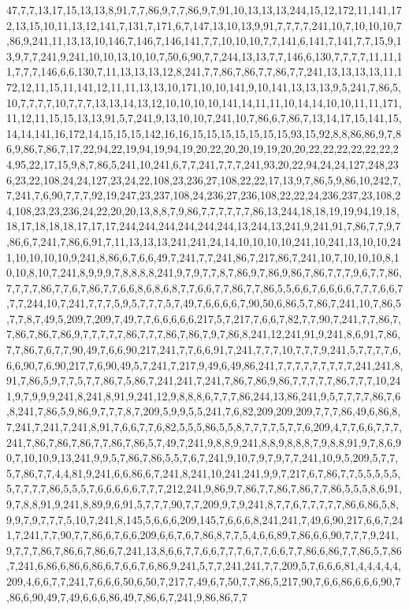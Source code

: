 47,7,7,13,17,15,13,13,8,91,7,7,86,9,7,7,86,9,7,91,10,13,13,13,244,15,12,172,11,141,172,13,15,10,11,13,12,141,7,131,7,171,6,7,147,13,10,13,9,91,7,7,7,7,241,10,7,10,10,10,7,86,9,241,11,13,13,10,146,7,146,7,146,141,7,7,10,10,10,7,7,141,6,141,7,141,7,7,15,9,13,9,7,7,241,9,241,10,10,13,10,10,7,50,6,90,7,7,244,13,13,7,7,146,6,130,7,7,7,7,11,11,11,7,7,7,146,6,6,130,7,11,13,13,13,12,8,241,7,7,86,7,86,7,7,86,7,7,241,13,13,13,13,11,172,12,11,15,11,141,12,11,11,13,13,10,171,10,10,141,9,10,141,13,13,13,9,5,241,7,86,5,10,7,7,7,7,10,7,7,7,13,13,14,13,12,10,10,10,10,141,14,11,11,10,14,14,10,10,11,11,171,11,12,11,15,15,13,13,91,5,7,241,9,13,10,10,7,241,10,7,86,6,7,86,7,13,14,17,15,141,15,14,14,141,16,172,14,15,15,15,142,16,16,15,15,15,15,15,15,15,93,15,92,8,8,86,86,9,7,86,9,86,7,86,7,17,22,94,22,19,94,19,94,19,20,22,20,20,19,19,20,20,22,22,22,22,22,22,24,95,22,17,15,9,8,7,86,5,241,10,241,6,7,7,241,7,7,7,241,93,20,22,94,24,24,127,248,236,23,22,108,24,24,127,23,24,22,108,23,236,27,108,22,22,17,13,9,7,86,5,9,86,10,242,7,7,241,7,6,90,7,7,7,92,19,247,23,237,108,24,236,27,236,108,22,22,24,236,237,23,108,24,108,23,23,236,24,22,20,20,13,8,8,7,9,86,7,7,7,7,7,7,86,13,244,18,18,19,19,94,19,18,18,17,18,18,18,17,17,17,244,244,244,244,244,244,13,244,13,241,9,241,91,7,86,7,7,9,7,86,6,7,241,7,86,6,91,7,11,13,13,13,241,241,24,14,10,10,10,10,241,10,241,13,10,10,241,10,10,10,10,9,241,8,86,6,7,6,6,49,7,241,7,7,241,86,7,217,86,7,241,10,7,10,10,10,8,10,10,8,10,7,241,8,9,9,9,7,8,8,8,8,241,9,7,9,7,7,8,7,86,9,7,86,9,86,7,86,7,7,7,9,6,7,7,86,7,7,7,7,86,7,7,6,7,86,7,7,6,6,8,6,8,6,8,7,7,6,6,7,7,86,7,7,86,5,5,6,6,7,6,6,6,6,7,7,7,6,6,7,7,7,244,10,7,241,7,7,7,5,9,5,7,7,7,5,7,49,7,6,6,6,6,7,90,50,6,86,5,7,86,7,241,10,7,86,5,7,7,8,7,49,5,209,7,209,7,49,7,7,6,6,6,6,6,217,5,7,217,7,6,6,7,82,7,7,90,7,241,7,7,86,7,7,86,7,86,7,86,9,7,7,7,7,7,86,7,7,7,86,7,86,7,9,7,86,8,241,12,241,91,9,241,8,6,91,7,86,7,7,86,7,6,7,7,90,49,7,6,6,90,217,241,7,7,6,6,91,7,241,7,7,7,10,7,7,7,9,241,5,7,7,7,7,6,6,6,90,7,6,90,217,7,6,90,49,5,7,241,7,217,9,49,6,49,86,241,7,7,7,7,7,7,7,7,7,241,241,8,91,7,86,5,9,7,7,5,7,7,86,7,5,86,7,241,241,7,241,7,86,7,86,9,86,7,7,7,7,7,86,7,7,7,10,241,9,7,9,9,9,241,8,241,8,91,9,241,12,9,8,8,8,6,7,7,7,86,244,13,86,241,9,5,7,7,7,7,86,7,6,8,241,7,86,5,9,86,9,7,7,7,8,7,209,5,9,9,5,5,241,7,6,82,209,209,209,7,7,7,86,49,6,86,8,7,241,7,241,7,241,8,91,7,6,6,7,7,6,82,5,5,5,86,5,5,8,7,7,7,7,5,7,7,6,209,4,7,7,6,6,7,7,7,241,7,86,7,86,7,86,7,7,86,7,86,5,7,49,7,241,9,8,8,9,241,8,8,9,8,8,8,7,9,8,8,91,9,7,8,6,90,7,10,10,9,13,241,9,9,5,7,86,7,86,5,5,7,6,7,241,9,10,7,9,7,9,7,7,241,10,9,5,209,5,7,7,5,7,86,7,7,4,4,81,9,241,6,6,86,6,7,241,8,241,10,241,241,9,9,7,217,6,7,86,7,7,5,5,5,5,5,5,7,7,7,7,86,5,5,5,7,6,6,6,6,6,7,7,7,212,241,9,86,9,7,86,7,7,86,7,86,7,7,86,5,5,5,8,6,91,9,7,8,8,91,9,241,8,89,9,6,91,5,7,7,7,90,7,7,209,9,7,9,241,8,7,7,6,7,7,7,7,7,86,6,86,5,8,9,9,7,9,7,7,7,5,10,7,241,8,145,5,6,6,6,209,145,7,6,6,6,8,241,241,7,49,6,90,217,6,6,7,241,7,241,7,7,90,7,7,86,6,7,6,6,209,6,6,7,6,7,86,8,7,7,5,4,6,6,89,7,86,6,6,90,7,7,7,9,241,9,7,7,7,86,7,86,6,7,86,6,7,241,13,8,6,6,7,7,6,6,7,7,7,6,7,7,6,6,7,7,86,6,86,7,7,86,5,7,86,7,241,6,86,6,86,6,86,6,7,6,6,7,6,86,9,241,5,7,7,241,241,7,7,209,5,7,6,6,6,81,4,4,4,4,4,209,4,6,6,7,7,241,7,6,6,6,50,6,50,7,217,7,49,6,7,50,7,7,86,5,217,90,7,6,6,86,6,6,6,90,7,86,6,90,49,7,49,6,6,6,86,49,7,86,6,7,241,9,86,86,7,7